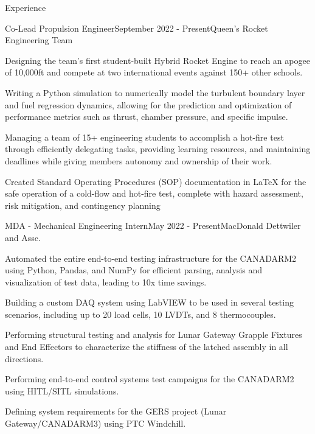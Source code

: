 \documentclass{resume} %
\begin{document}

\begin{rSection}{Experience}

\begin{rSubsection}{Co-Lead Propulsion Engineer}{September 2022 - Present}{Queen's Rocket Engineering Team}{}
\item Designing the team's first student-built Hybrid Rocket Engine to reach an apogee of 10,000ft and compete at two international events against 150+ other schools.
\item Writing a Python simulation to numerically model the turbulent boundary layer and fuel regression dynamics, allowing for the prediction and optimization of performance metrics such as thrust, chamber pressure, and specific impulse.
\item Managing a team of 15+ engineering students to accomplish a hot-fire test through efficiently delegating tasks, providing learning resources, and maintaining deadlines while giving members autonomy and ownership of their work.
\item Created Standard Operating Procedures (SOP) documentation in LaTeX for the safe operation of a cold-flow and hot-fire test, complete with hazard assessment, risk mitigation, and contingency planning
\end{rSubsection}

\begin{rSubsection}{MDA - Mechanical Engineering Intern}{May 2022 - Present}{MacDonald Dettwiler and Assc.}{}

\item Automated the entire end-to-end testing infrastructure for the CANADARM2 using Python, Pandas, and NumPy for efficient parsing, analysis and visualization of test data, leading to 10x time savings.
\item Building a custom DAQ system using LabVIEW to be used in several testing scenarios, including up to 20 load cells, 10 LVDTs, and 8 thermocouples.
\item Performing structural testing and analysis for Lunar Gateway Grapple Fixtures and End Effectors to characterize the stiffness of the latched assembly in all directions.
\item Performing end-to-end control systems test campaigns for the CANADARM2 using HITL/SITL simulations.
\item Defining system requirements for the GERS project (Lunar Gateway/CANADARM3) using PTC Windchill.


\end{rSubsection}
\end{rSection}
\end{document}
